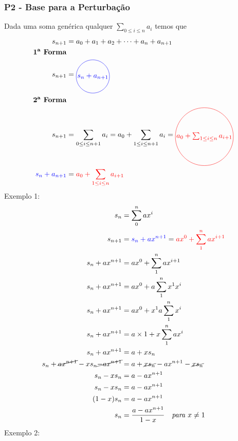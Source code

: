 \documentclass{article}
\begin{document}
\subsubsection{P2 - Base para a Perturbação}
Dada uma soma genérica qualquer $\sum_{0\leq i\leq n} a_i$ temos que 
\begin{equation}
    \begin{aligned}
        s_{n+1} &= a_0 + a_1 + a_2 + \dots + a_n + a_{n+1} \\
        \textbf{1\textsuperscript{a} Forma} \\
        s_{n+1} &= \tikz[baseline]{\node[draw,circle,blue,inner sep=1pt] {$s_n + a_{n+1}$};} \\
        \textbf{2\textsuperscript{a} Forma} \\
        s_{n+1} &= \sum_{0\leq i \leq n+1} a_i 
            = a_0 +\sum_{1\leq i \leq n+1} a_i
            = \tikz[baseline]{\node[draw,circle,red,inner sep=1pt] {$a_0 + \sum_{1 \leq i \leq n} a_{i+1}$};} \\
        \textcolor{blue}{s_n + a_{n+1}} &= \textcolor{red}{a_0 + \sum_{1 \leq i \leq n} a_{i+1}}
    \end{aligned}
\end{equation}
Exemplo 1:
\begin{equation}
    \begin{aligned}
     s_n &= \sum_0^n ax^i \\
     s_{n+1} &= \textcolor{blue}{s_n + ax^{n+1}} =\textcolor{red}{ax^{0} +\sum_1^{n}ax^{i+1}} \\
    s_n + ax^{n+1} &= ax^{0} +\sum_1^{n}ax^{i+1} \\
    s_n + ax^{n+1} &= ax^{0} + a\sum_1^{n}x^{1}x^{i} \\
    s_n + ax^{n+1} &= ax^{0} + x^{1}a\sum_1^{n}x^{i}\\
    s_n + ax^{n+1} &= a\times1 + x\sum_1^{n}ax^{i}\\
    s_n + ax^{n+1} &= a + xs_n \\
    s_n + \cancel{ax^{n+1}} - xs_n \cancel{-ax^{n+1}} &= a + \cancel{xs_n} -ax^{n+1} - \cancel{xs_n} \\
    s_n - xs_n  &= a - ax^{n+1} \\
    s_n - xs_n  &= a - ax^{n+1} \\
    (1 - x)s_n  &= a - ax^{n+1} \\
    s_n &= \frac{a - ax^{n+1}}{1-x} \quad \textit{para } x \neq 1
    \end{aligned}
\end{equation}
Exemplo 2:
\end{document}
